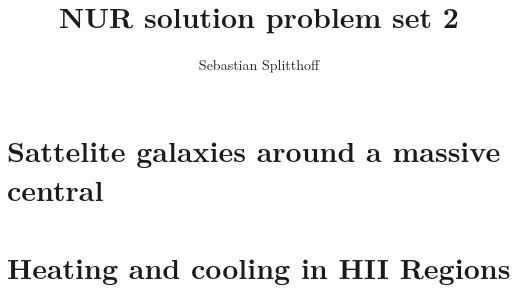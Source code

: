\documentclass[a4paper,10pt]{article}
\title{NUR solution problem set 2}
\author{Sebastian Splitthoff}
\begin{document}
\maketitle

\section{Sattelite galaxies around a massive central}








\section{Heating and cooling in HII Regions}



\end{document}
